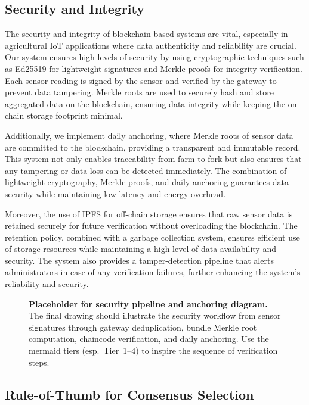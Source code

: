 \subsection{Security and Integrity}
\label{subsec:security-integrity}

The security and integrity of blockchain-based systems are vital, especially in agricultural IoT applications where data authenticity and reliability are crucial. Our system ensures high levels of security by using cryptographic techniques such as Ed25519 for lightweight signatures and Merkle proofs for integrity verification. Each sensor reading is signed by the sensor and verified by the gateway to prevent data tampering. Merkle roots are used to securely hash and store aggregated data on the blockchain, ensuring data integrity while keeping the on-chain storage footprint minimal.

Additionally, we implement daily anchoring, where Merkle roots of sensor data are committed to the blockchain, providing a transparent and immutable record. This system not only enables traceability from farm to fork but also ensures that any tampering or data loss can be detected immediately. The combination of lightweight cryptography, Merkle proofs, and daily anchoring guarantees data security while maintaining low latency and energy overhead.

Moreover, the use of IPFS for off-chain storage ensures that raw sensor data is retained securely for future verification without overloading the blockchain. The retention policy, combined with a garbage collection system, ensures efficient use of storage resources while maintaining a high level of data availability and security. The system also provides a tamper-detection pipeline that alerts administrators in case of any verification failures, further enhancing the system’s reliability and security.

\begin{figure}[h]
  \centering
  \caption{\textbf{Placeholder for security pipeline and anchoring diagram.} The final drawing should illustrate the security workflow from sensor signatures through gateway deduplication, bundle Merkle root computation, chaincode verification, and daily anchoring. Use the mermaid tiers (esp.~Tier~1–4) to inspire the sequence of verification steps.}
  \label{fig:security-pipeline}
\end{figure}

\subsection{Rule-of-Thumb for Consensus Selection}
\label{subsec:rule-of-thumb}

